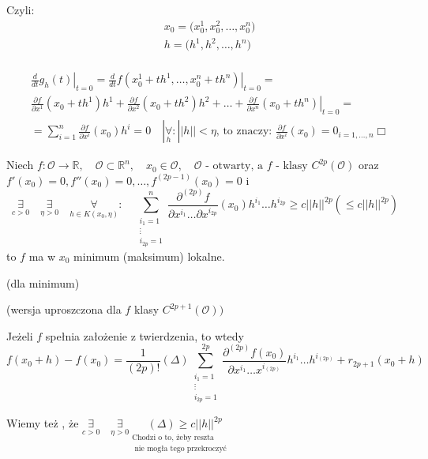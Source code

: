 \documentclass[../main.tex]{subfiles}
\begin{document}
Czyli:
\begin{align*}
    &x_0 = \big ( x_0^1, x_0^2, \dots, x_0^n)\\
    &h = \big ( h^1, h^2, \dots, h^n)\\
\end{align*}

\begin{align*}
&\left . \frac{d}{dt} g_h (t) \right |_{t=0} = \left .\frac{d}{dt} f(x_0^1 + th^1, \dots, x_0^n + th^n) \right |_{t=0} = \\
& \frac{\partial f}{\partial x^1} (x_0 + th^1) h^1 + \frac{\partial f}{\partial x^2} (x_0 + th^2) h^2 + \dots + \left .\frac{\partial f}{\partial x^n} (x_0 + th^n) \right |_{t=0}=\\
&=\sum_{i=1}^n \frac{\partial f}{\partial x^i} (x_0) h^i = 0 \quad |\underset{h}{\forall}: ||h|| < \eta \text{, to znaczy: }\frac{\partial f}{\partial x^i} (x_0) = 0_{i = 1,\dots,n} \Box
\end{align*}

\begin{tw}
Niech $f: \mathcal{O} \to \mathbb{R}, \quad\mathcal{O}\subset\mathbb{R}^n, \quad x_0\in\mathcal{O}, \quad \mathcal{O} \text{ - otwarty, a } f \text{ - klasy } C^{2p} (\mathcal{O})$ oraz $f'(x_0) = 0, f''(x_0) = 0,\dots,f^{(2p-1)} (x_0) = 0$
i $$\underset{c > 0}{\exists} \quad\underset{\eta > 0}{\exists} \quad\underset{h\in K(x_0,\eta)}{\forall}: \quad \sum_{\substack{i_1 = 1\\ \vdots \\ i_{2p} = 1}}^n \frac{\partial^{(2p)} f}{\partial x^{i_1} \dots \partial x^{i_{2p}}} (x_0) h^{i_1} \dots h^{i_{2p}} \geq c ||h||^{2p} (\leq c||h||^{2p})$$
to $f$ ma w $x_0$ minimum (maksimum) lokalne.
\end{tw}

\vspace{1cm}
\begin{dowod}
    (dla minimum)

(wersja uproszczona dla $f$ klasy $C^{2p+1}(\mathcal{O}))$
\end{dowod}

Jeżeli $f$ spełnia założenie z twierdzenia, to wtedy $$f(x_0+h)-f(x_0) = \frac{1}{(2p)!} (\Delta)\sum_{\substack{i_1 = 1\\ \vdots \\ i_{2p} = 1}}^{2p} \frac{\partial^{(2p)} f(x_0)}{\partial x^{i_1} \dots x^{i_{(2p)}}} h^{i_1} \dots h^{i_{(2p)}} + r_{2p + 1} (x_0 + h)$$

Wiemy też , że $\underset{c > 0}{\exists}\quad \underset{\eta > 0}{\exists} \underset{\substack{\text{Chodzi o to, żeby reszta}\\ \text{ nie mogła tego przekroczyć}}}{\quad(\Delta) \geq c ||h||^{2p}}$
\end{document}

